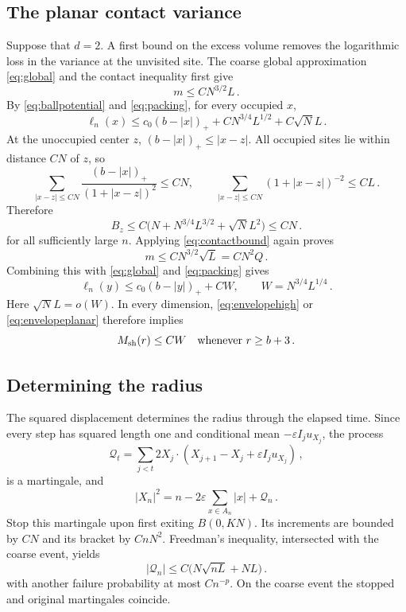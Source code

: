 \documentclass[11pt]{amsart}
\theoremstyle{plain}
\theoremstyle{definition}
\newcommand{\eps}{\varepsilon}
\begin{document}
\subsection{The planar contact variance}
Suppose that $d=2$. A first bound on the excess volume removes the
logarithmic loss in the variance at the unvisited site.
The coarse global approximation \eqref{eq:global} and the contact
inequality first give
\[
 m\leq CN^{3/2}L\, .
\]
By \eqref{eq:ballpotential} and \eqref{eq:packing}, for every occupied $x$,
\[
 \ell_n(x)\leq c_0(b-|x|)_+
       +CN^{3/4}L^{1/2}+C\sqrt N L\, .
\]
At the unoccupied center $z$, $(b-|x|)_+\leq|x-z|$.
All occupied sites lie within distance $CN$ of $z$, so
\[
 \sum_{|x-z|\leq CN}\frac{(b-|x|)_+}{(1+|x-z|)^2}
 \leq CN,\qquad
 \sum_{|x-z|\leq CN}(1+|x-z|)^{-2}\leq CL\, .
\]
Therefore
\[
 B_z\leq C\big(N+N^{3/4}L^{3/2}+\sqrt N L^2\big)
       \leq CN\, .
\]
for all sufficiently large $n$. Applying
\eqref{eq:contactbound} again proves
\begin{equation}\label{eq:massplanar}
 m\leq CN^{3/2}\sqrt L=CN^2Q\, .
\end{equation}
Combining this with \eqref{eq:global} and \eqref{eq:packing} gives
\begin{equation}\label{eq:envelopeplanar}
 \ell_n(y)\leq c_0(b-|y|)_++CW,
 \qquad W=N^{3/4}L^{1/4}\, .
\end{equation}
Here $\sqrt N L=o(W)$.
In every dimension, \eqref{eq:envelopehigh} or \eqref{eq:envelopeplanar}
therefore implies
\begin{equation}\label{eq:shellW}
 M_{\rm sh}(r)\leq CW\quad\hbox{whenever }r\geq b+3\, .
\end{equation}

\subsection{Determining the radius}
The squared displacement determines the radius through the elapsed time.
Since every step has squared length one and conditional mean
$-\eps I_ju_{X_j}$, the process
\[
\mathcal Q_t=\sum_{j<t}2X_j\cdot(X_{j+1}-X_j+\eps I_ju_{X_j})\, ,
\]
is a martingale, and
\begin{equation}\label{eq:quadratic}
 |X_n|^2=n-2\eps\sum_{x\in A_n}|x|+\mathcal Q_n\, .
\end{equation}
Stop this martingale upon first exiting $B(0,KN)$. Its increments are bounded by $CN$ and its
bracket by $CnN^2$. Freedman's inequality, intersected with the
coarse event, yields
\begin{equation}\label{eq:quadraticerror}
 |\mathcal Q_n|\leq C\big(N\sqrt{nL}+NL\big)\, .
\end{equation}
with another failure probability at most $Cn^{-p}$.
On the coarse event the stopped and original martingales coincide.
\end{document}

